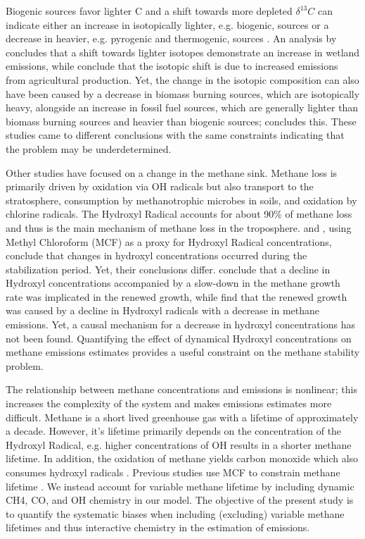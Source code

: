 \documentclass[two column,grl]{AGUTeX}
\begin{document}
\begin{article}
Biogenic sources favor lighter C and a shift towards more depleted $\delta^{13}C$ can indicate either an increase in isotopically lighter, e.g. biogenic, sources or a decrease in heavier, e.g. pyrogenic and thermogenic, sources \citep{nisbet_rising_nodate, schaefer2016}. An analysis by \citep{nisbet_rising_nodate} concludes that a shift towards lighter isotopes demonstrate an increase in wetland emissions, while \citep{schaefer2016} conclude that the isotopic shift is due to increased emissions from agricultural production. Yet, the change in the isotopic composition can also have been caused by a decrease in biomass burning sources, which are isotopically heavy, alongside an increase in fossil fuel sources, which are generally lighter than biomass burning sources and heavier than biogenic sources; \citep{worden_reduced_2017} concludes this. These studies came to different conclusions with the same constraints indicating that the problem may be underdetermined.

Other studies have focused on a change in the methane sink. Methane loss is primarily driven by oxidation via OH radicals but also transport to the stratosphere, consumption by methanotrophic microbes in soils, and oxidation by chlorine radicals. The Hydroxyl Radical accounts for about 90\% of methane loss and thus is the main mechanism of methane loss in the troposphere. \citep{turner_ambiguity_2017} and \citep{rigby_role_2017}, using Methyl Chloroform (MCF) as a proxy for Hydroxyl Radical concentrations, conclude that changes in hydroxyl concentrations occurred during the stabilization period. Yet, their conclusions differ. \citep{rigby_role_2017} conclude that a decline in Hydroxyl concentrations accompanied by a slow-down in the methane growth rate was implicated in the renewed growth, while \citep{turner_ambiguity_2017} find that the renewed growth was caused by a decline in Hydroxyl radicals with a decrease in methane emissions. Yet, a causal mechanism for a decrease in hydroxyl concentrations has not been found. Quantifying the effect of dynamical Hydroxyl concentrations on methane emissions estimates provides a useful constraint on the methane stability problem.

The relationship between methane concentrations and emissions is nonlinear; this increases the complexity of the system and makes emissions estimates more difficult. Methane is a short lived greenhouse gas with a lifetime of approximately a decade. However, it’s lifetime primarily depends on the concentration of the Hydroxyl Radical, e.g. higher concentrations of OH results in a shorter methane lifetime. In addition, the oxidation of methane yields carbon monoxide which also consumes hydroxyl radicals \citep{prather_lifetimes_2007}. Previous studies use MCF to constrain methane lifetime \citep{rigby_role_2017, turner_ambiguity_2017}. We instead account for variable methane lifetime by including dynamic CH4, CO, and OH chemistry in our model. The objective of the present study is to quantify the systematic biases when including (excluding) variable methane lifetimes and thus interactive chemistry in the estimation of emissions.


\end{article}
\end{document}
